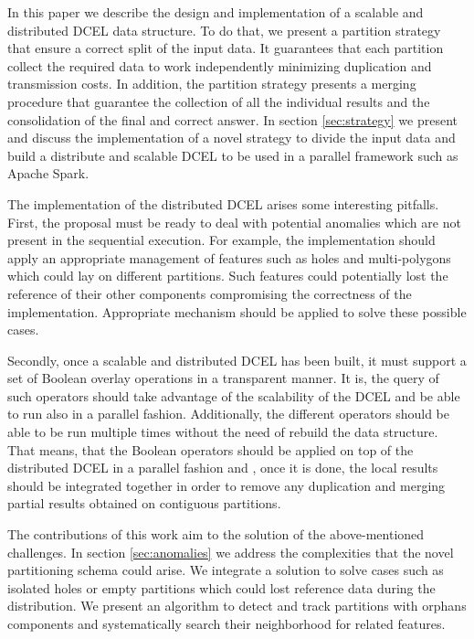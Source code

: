 In this paper we describe the design and implementation of a scalable and distributed DCEL data structure.  To do that, we present a partition strategy that ensure a correct split of the input data.  It guarantees that each partition collect the required data to work independently minimizing duplication and transmission costs.  In addition, the partition strategy presents a merging procedure that guarantee the collection of all the individual results and the consolidation of the final and correct answer.  In section \ref{sec:strategy} we present and discuss the implementation of a novel strategy to divide the input data and build a distribute and scalable DCEL to be used in a parallel framework such as Apache Spark. 

The implementation of the distributed DCEL arises some interesting pitfalls.  First, the proposal must be ready to deal with potential anomalies which are not present in the sequential execution.  For example, the implementation should apply an appropriate management of features such as holes and multi-polygons which could lay on different partitions.  Such features could potentially lost the reference of their other components compromising the correctness of the implementation.  Appropriate mechanism should be applied to solve these possible cases.

Secondly, once a scalable and distributed DCEL has been built, it must support a set of Boolean overlay operations in a transparent manner.  It is, the query of such operators should take advantage of the scalability of the DCEL and be able to run also in a parallel fashion.  Additionally, the different operators should be able to be run multiple times without the need of rebuild the data structure.  That means, that the Boolean operators should be applied on top of the distributed DCEL in a parallel fashion and , once it is done, the local results should be integrated together in order to remove any duplication and merging partial results obtained on contiguous partitions.  


The contributions of this work aim to the solution of the above-mentioned challenges.  In section \ref{sec:anomalies} we address the complexities that the novel partitioning schema could arise.  We integrate a solution to solve cases such as isolated holes or empty partitions which could lost reference data during the distribution. We present an algorithm to detect and track partitions with orphans components and systematically search their neighborhood for related features.  

